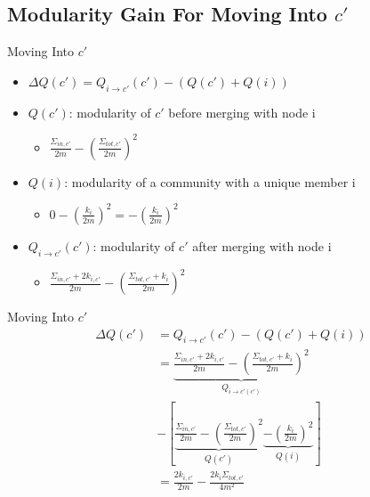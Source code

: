 \documentclass[12pt]{beamer}
\begin{document}
\subsection{Modularity Gain For Moving Into $c'$}
\begin{frame}{Moving Into $c'$}
\begin{itemize}
    \item $\Delta Q(c') = Q_{i\to c'}(c') - ( Q(c') + Q(i))$
    \item $Q(c')$: modularity of $c'$ before merging with node i
    \begin{itemize}
        \Large
        \item $\frac{\Sigma_{in, c'}}{2m} - (\frac{\Sigma_{tot, c'}}{2m})^2$
    \end{itemize}
    \item $Q(i)$: modularity of a community with a unique member i
    \begin{itemize}
        \Large
        \item $0-(\frac{k_i}{2m})^2 = - (\frac{k_i}{2m})^2$
    \end{itemize}
    \item $Q_{i\to c'}(c')$: modularity of $c'$ after merging with node i
    \begin{itemize}
        \Large
        \item $\frac{\Sigma_{in, c'}+2k_{i, c'}}{2m} - (\frac{\Sigma_{tot, c'}+k_i}{2m})^2$
    \end{itemize}
\end{itemize}
\end{frame}


\begin{frame}{Moving Into $c'$}
\begin{align*}
\Delta Q(c')
    &= Q_{i\to c'}(c') - ( Q(c') + Q(i)) \\
    &= \underbrace{\frac{\Sigma_{in, c'}+2k_{i, c'}}{2m} - (\frac{\Sigma_{tot, c'}+k_i}{2m})^2}_{Q_{i\to c'(c')}} \\
        &- [ \underbrace{\frac{\Sigma_{in, c'}}{2m} - (\frac{\Sigma_{tot, c'}}{2m})^2}_{Q(c')} \underbrace{- (\frac{k_i}{2m})^2}_{Q(i)} ] \\
    &= \frac{2k_{i, c'}}{2m} - \frac{2k_i\Sigma_{tot, c'}}{4m^2}
\end{align*}
\end{frame}
\end{document}
